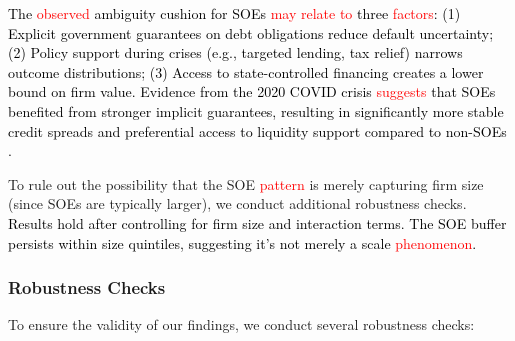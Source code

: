 \documentclass[preprint,12pt,authoryear]{elsarticle}
\begin{document}
 \textcolor{black}{The \textcolor{red}{observed} ambiguity cushion for SOEs \textcolor{red}{may relate to} three \textcolor{red}{factors}: (1) Explicit government guarantees on debt obligations reduce default uncertainty; (2) Policy support during crises (e.g., targeted lending, tax relief) narrows outcome distributions; (3) Access to state-controlled financing creates a lower bound on firm value. Evidence from the 2020 COVID crisis \textcolor{red}{suggests} that SOEs benefited from stronger implicit guarantees, resulting in significantly more stable credit spreads and preferential access to liquidity support compared to non-SOEs \citep{Geng2024}.}
  
  To rule out the possibility that the SOE \textcolor{red}{pattern} is merely capturing firm size (since SOEs are typically larger), we conduct additional robustness checks. \textcolor{black}{Results hold after controlling for firm size and interaction terms. The SOE buffer persists within size quintiles, suggesting it's not merely a scale \textcolor{red}{phenomenon}.}

\subsubsection{Robustness Checks}
\label{sec:robustness}

To ensure the validity of our findings, we conduct several robustness checks:
\end{document}
